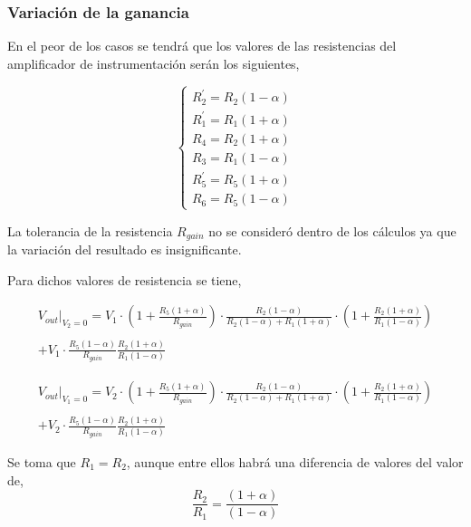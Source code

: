 \documentclass[12pt,A4paper,titlepage]{article}
\begin{document}
\newpage
\subsubsection{Variación de la ganancia}
\hspace{1mm} En el peor de los casos se tendrá que los valores de las resistencias del amplificador de instrumentación serán los siguientes, 

\begin{equation}
  \label{eq4}
\begin{cases}  R_2^{'} = R_2(1 - \alpha)
		\\R_1^{'} = R_1(1+\alpha)
		\\R_4 =  R_2(1+\alpha)
		\\R_3 =  R_1(1-\alpha)
		\\R_5^{'} =  R_5(1+\alpha)
		\\R_6 =  R_5(1-\alpha)
\end{cases}
\end{equation}

\bigskip
\hspace{1mm} La tolerancia de la resistencia \(R_{gain}\) no se consideró dentro de los cálculos ya que la variación del resultado es insignificante.

\hspace{1mm} Para dichos valores de resistencia se tiene,

\begin{multline}
    V_{out}|_{V_2=0} =  V_1 \cdot \left(1 + \frac{R_5 (1+\alpha)}{R_{gain}}\right) \cdot \frac{R_2 (1-\alpha)}{R_2 (1-\alpha) + R_1 (1 + \alpha)} \cdot \left(1 + \frac{R_2 (1 + \alpha)}{R_1 (1 - \alpha)}\right) 
    \\
    \\ + V_1 \cdot \frac{R_5 (1 - \alpha)}{R_{gain}} \frac{R_2 (1 + \alpha)}{R_1 (1 - \alpha)}    
\end{multline}

\begin{multline}
    V_{out}|_{V_1=0} =  V_2 \cdot \left(1 + \frac{R_5 (1+\alpha)}{R_{gain}}\right) \cdot \frac{R_2 (1-\alpha)}{R_2 (1-\alpha) + R_1 (1 + \alpha)} \cdot \left(1 + \frac{R_2 (1 + \alpha)}{R_1 (1 - \alpha)}\right) 
    \\
    \\ + V_2 \cdot \frac{R_5 (1 - \alpha)}{R_{gain}} \frac{R_2 (1 + \alpha)}{R_1 (1 - \alpha)}    
\end{multline}

\bigskip
\hspace{1mm} Se toma que \(R_1 = R_2\), aunque entre ellos habrá una diferencia de valores del valor de,
\begin{equation}
    \frac{R_2}{R_1} = \frac{(1 + \alpha)}{(1 - \alpha)}
\end{equation}
\end{document}
